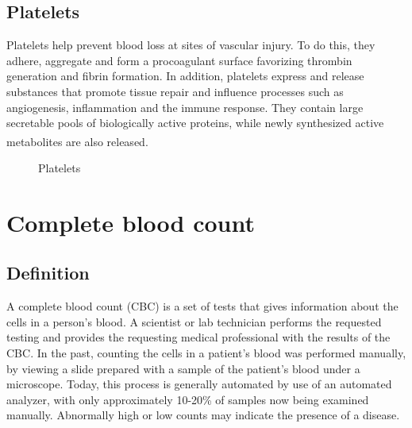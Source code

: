 \subsection{Platelets}
\hspace{\parindent}
Platelets help prevent blood loss at sites of vascular injury. To do this, they adhere, aggregate and form a procoagulant surface favorizing thrombin generation and fibrin formation. In addition, platelets express and release substances that promote tissue repair and influence processes such as angiogenesis, inflammation and the immune response. They contain large secretable pools of biologically active proteins, while newly synthesized active metabolites are also released. \textsuperscript{\cite{nurden2008platelets}}

\vspace{0.2in}

\begin{figure}[h]
\centering
  \vspace{-0.1in}
    \centerline{}
    \caption{Platelets}
\end{figure}

\vspace{-0.1in}

\section{Complete blood count}
\subsection{Definition}
\hspace{\parindent}
A complete blood count (CBC) is a set of tests that gives information about the cells in a person's blood. A scientist or lab technician performs the requested testing and provides the requesting medical professional with the results of the CBC. In the past, counting the cells in a patient's blood was performed manually, by viewing a slide prepared with a sample of the patient's blood under a microscope. Today, this process is generally automated by use of an automated analyzer, with only approximately 10-20\% of samples now being examined manually. Abnormally high or low counts may indicate the presence of a disease.

